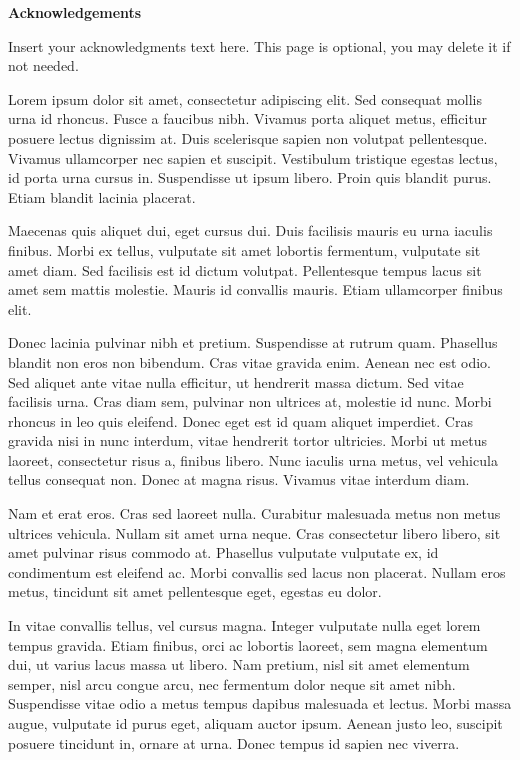 
\begin{center}

\textbf{\large Acknowledgements}
\end{center}


\begin{flushleft}
\hspace{10mm}Insert your acknowledgments text here. This page is optional, you may delete it if not needed. 

Lorem ipsum dolor sit amet, consectetur adipiscing elit. Sed consequat mollis urna id rhoncus. Fusce a faucibus nibh. Vivamus porta aliquet metus, efficitur posuere lectus dignissim at. Duis scelerisque sapien non volutpat pellentesque. Vivamus ullamcorper nec sapien et suscipit. Vestibulum tristique egestas lectus, id porta urna cursus in. Suspendisse ut ipsum libero. Proin quis blandit purus. Etiam blandit lacinia placerat.

Maecenas quis aliquet dui, eget cursus dui. Duis facilisis mauris eu urna iaculis finibus. Morbi ex tellus, vulputate sit amet lobortis fermentum, vulputate sit amet diam. Sed facilisis est id dictum volutpat. Pellentesque tempus lacus sit amet sem mattis molestie. Mauris id convallis mauris. Etiam ullamcorper finibus elit.

Donec lacinia pulvinar nibh et pretium. Suspendisse at rutrum quam. Phasellus blandit non eros non bibendum. Cras vitae gravida enim. Aenean nec est odio. Sed aliquet ante vitae nulla efficitur, ut hendrerit massa dictum. Sed vitae facilisis urna. Cras diam sem, pulvinar non ultrices at, molestie id nunc. Morbi rhoncus in leo quis eleifend. Donec eget est id quam aliquet imperdiet. Cras gravida nisi in nunc interdum, vitae hendrerit tortor ultricies. Morbi ut metus laoreet, consectetur risus a, finibus libero. Nunc iaculis urna metus, vel vehicula tellus consequat non. Donec at magna risus. Vivamus vitae interdum diam.

Nam et erat eros. Cras sed laoreet nulla. Curabitur malesuada metus non metus ultrices vehicula. Nullam sit amet urna neque. Cras consectetur libero libero, sit amet pulvinar risus commodo at. Phasellus vulputate vulputate ex, id condimentum est eleifend ac. Morbi convallis sed lacus non placerat. Nullam eros metus, tincidunt sit amet pellentesque eget, egestas eu dolor.

In vitae convallis tellus, vel cursus magna. Integer vulputate nulla eget lorem tempus gravida. Etiam finibus, orci ac lobortis laoreet, sem magna elementum dui, ut varius lacus massa ut libero. Nam pretium, nisl sit amet elementum semper, nisl arcu congue arcu, nec fermentum dolor neque sit amet nibh. Suspendisse vitae odio a metus tempus dapibus malesuada et lectus. Morbi massa augue, vulputate id purus eget, aliquam auctor ipsum. Aenean justo leo, suscipit posuere tincidunt in, ornare at urna. Donec tempus id sapien nec viverra.
\end{flushleft}



